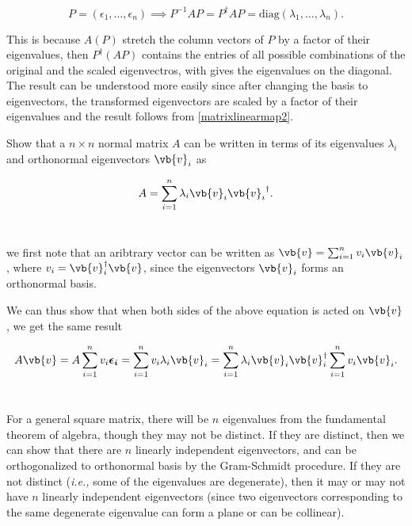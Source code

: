 \documentclass[a4paper,12pt]{report}
\begin{document}
\begin{equation}
    P = (\epsilon _{1}, \ldots , \epsilon _{n}  ) \implies  P^{-1} AP = P^\dagger AP = \text{diag}(\lambda_1, \ldots, \lambda_n).
\end{equation}

This is because \(A(P)\) stretch the column vectors of \(P\) by a factor of their eigenvalues, then \(P^{\dagger} (AP)\) contains the entries of all possible combinations of the original and the scaled eigenvectros, with gives the eigenvalues on the diagonal. The result can be understood more easily since after changing the basis to eigenvectors, the transformed eigenvectors are scaled by a factor of their eigenvalues and the result follows from \cref{matrixlinearmap2}. 

{Show that a \(n \times n\) normal matrix \(A\) can be written in terms of its eigenvalues \(\lambda _{i} \) and orthonormal eigenvectors \(\vb{v}  _{i} \) as 

\begin{equation}
    A = \sum_{i=1}^{n} \lambda _{i} \vb{v}_{i}  {\vb{v}_{i}   }^{\dagger} .
\end{equation}~
}
{we first note that an aribtrary vector can be written as \(\vb{v} = \sum_{i=1}^{n} v_{i} \vb{v}_{i}  \), where \(v_{i} = \vb{v}_{i}^{\dagger} \vb{v}\), since the eigenvectors \(\vb{v}_{i}  \) forms an orthonormal basis.

We can thus show that when both sides of the above equation is acted on \(\vb{v} \), we get the same result 

\begin{equation}
    A\vb{v} = A\sum_{i=1}^{n} v_{i}\boldsymbol{\epsilon _{i} } = \sum_{i=1}^{n} v_{i} \lambda _{i} \vb{v}_{i} = \sum_{i=1}^{n} \lambda _{i} \vb{v}_{i}{\vb{v} }_{i} ^{\dagger}\sum_{i=1}^{n} v_{i} \vb{v}_{i}.   
\end{equation}~
} 

For a general square matrix, there will be \(n\) eigenvalues from the fundamental theorem of algebra, though they may not be distinct. If they are distinct, then we can show that there are \(n\) linearly independent eigenvectors, and can be orthogonalized to orthonormal basis by the Gram-Schmidt procedure. If they are not distinct (\textit{i.e.,} some of the eigenvalues are degenerate), then it may or may not have \(n\) linearly independent eigenvectors (since two eigenvectors corresponding to the same degenerate eigenvalue can form a plane or can be collinear).
\end{document}
